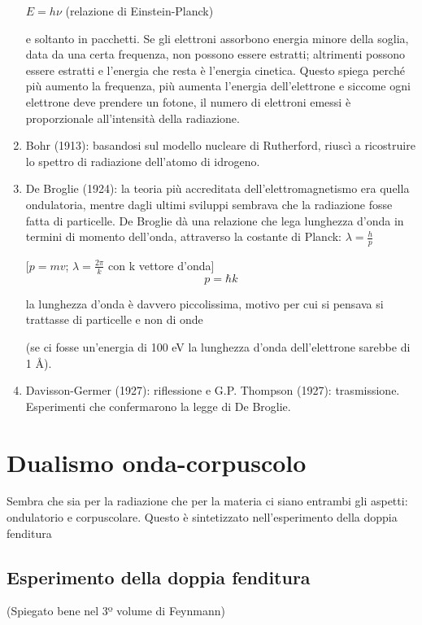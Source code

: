 \begin{enumerate}
$E=h\nu$ (relazione di Einstein-Planck) 

e soltanto in pacchetti. Se gli elettroni assorbono energia minore
della soglia, data da una certa frequenza, non possono essere estratti;
altrimenti possono essere estratti e l'energia che resta è l'energia
cinetica. Questo spiega perché più aumento la frequenza, più aumenta
l'energia dell'elettrone e siccome ogni elettrone deve prendere un
fotone, il numero di elettroni emessi è proporzionale all'intensità
della radiazione. 

\item Bohr (1913): basandosi sul modello nucleare di Rutherford, riuscì
a ricostruire lo spettro di radiazione dell'atomo di idrogeno. 
\item De Broglie (1924): la teoria più accreditata dell'elettromagnetismo
era quella ondulatoria, mentre dagli ultimi sviluppi sembrava che
la radiazione fosse fatta di particelle. De Broglie dà una relazione
che lega lunghezza d'onda in termini di momento dell'onda, attraverso
la costante di Planck: $\lambda=\frac{h}{p}$


{[}$p=mv$; $\lambda=\frac{2\pi}{k}$ con k vettore d'onda{]} 
\begin{equation}
p=\hbar k
\end{equation}



la lunghezza d'onda è davvero piccolissima, motivo per cui si pensava
si trattasse di particelle e non di onde


(se ci fosse un'energia di 100 eV la lunghezza d'onda dell'elettrone
sarebbe di 1 \AA{}).

\item Davisson-Germer (1927): riflessione e G.P. Thompson (1927): trasmissione.
Esperimenti che confermarono la legge di De Broglie.
\end{enumerate}

\section{Dualismo onda-corpuscolo} %
\label{sec:dualismo_onda_corpuscolo}

Sembra che sia per la radiazione che per la materia ci siano entrambi
gli aspetti: ondulatorio e corpuscolare. Questo è sintetizzato nell'esperimento
della doppia fenditura 


\subsection{Esperimento della doppia fenditura} %
\label{subsec:doppia_fenditura} (Spiegato bene nel 3º volume di Feynmann) 

